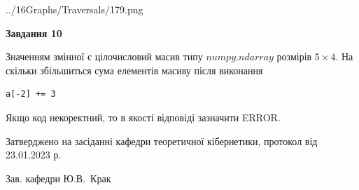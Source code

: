 \documentclass[12pt, ukrainian]{article}
\begin{document}
{\begin {large}
\begin{center}
	{../16Graphs/Traversals/179.png}
\end{center}\par
\newpage

{\begin {center}\textbf{Завдання 10}\end {center}}\par
Значенням змінної  є цілочисловий масив типу $numpy.ndarray$ розмірів $5{\times}4$. На скільки збільшиться сума елементів масиву  після виконання
\begin{verbatim}
a[-2] += 3
\end{verbatim}


Якщо код некоректний, то в якості відповіді зазначити ERROR.\par
\newpage


\end {large}
}
{\smallskip \begin {small} Затверджено на засіданні кафедри теоретичної кібернетики, протокол  від   23.01.2023 р.\par\smallskip\smallskip
{\parbox {6.5 cm}{Зав. кафедри \dotfill Ю.В.~Крак}} \end{small}}
\end{document}
